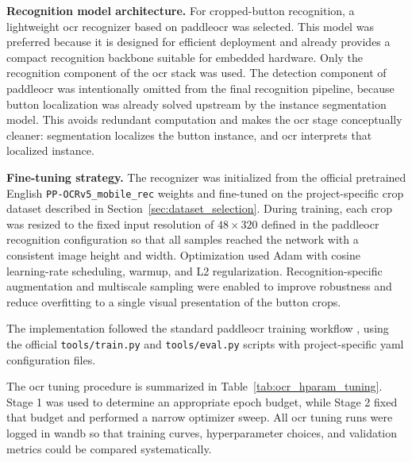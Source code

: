 \noindent\textbf{Recognition model architecture.}
For cropped-button recognition, a lightweight \gls{ocr} recognizer based on
\gls{paddleocr} \citep{paddleocrdocs2026} was selected. This model was preferred because it is
designed for efficient deployment and already provides a compact recognition
backbone suitable for embedded hardware. 
Only the recognition component of the \gls{ocr} stack was used. The detection component
of \gls{paddleocr} was intentionally omitted from the final recognition pipeline, because
button localization was already solved upstream by the instance segmentation model.
This avoids redundant computation and makes the \gls{ocr} stage conceptually cleaner:
segmentation localizes the button instance, and \gls{ocr} interprets that localized
instance.


\noindent\textbf{Fine-tuning strategy.}
The recognizer was initialized from the official pretrained English
\texttt{PP-OCRv5\_mobile\_rec} weights and fine-tuned on the project-specific crop
dataset described in Section~\ref{sec:dataset_selection}. During training, each crop was resized to the fixed input resolution of
$48 \times 320$ defined in the \gls{paddleocr} recognition configuration so that all
samples reached the network with a consistent image height and width.
Optimization used Adam with cosine learning-rate scheduling, warmup, and L2
regularization. Recognition-specific augmentation and multiscale sampling were
enabled to improve robustness and reduce overfitting to a single visual
presentation of the button crops.

The implementation followed the standard \gls{paddleocr} training workflow
\citep{paddleocrdocs2026}, using the official \texttt{tools/train.py} and
\texttt{tools/eval.py} scripts with project-specific \gls{yaml} configuration
files.

The \gls{ocr} tuning procedure is summarized in Table~\ref{tab:ocr_hparam_tuning}.
Stage 1 was used to determine an appropriate epoch budget, while Stage 2 fixed
that budget and performed a narrow optimizer sweep. All \gls{ocr} tuning runs
were logged in \gls{wandb} so that training curves, hyperparameter choices, and
validation metrics could be compared systematically.

